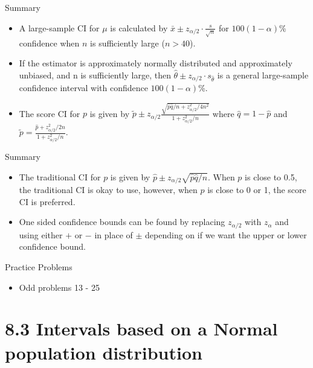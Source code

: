 \documentclass[
  ignorenonframetext,
]{beamer}
\providecommand{\tightlist}{%
  \setlength{\itemsep}{0pt}\setlength{\parskip}{0pt}}\usepackage{longtable,booktabs,array}
\begin{document}
\begin{frame}{Summary}
\protect\hypertarget{summary-2}{}
\begin{itemize}[<+->]
\tightlist
\item
  A large-sample CI for \(\mu\) is calculated by
  \(\bar{x} \pm z_{\alpha/2}\cdot \frac{s}{\sqrt{n}}\) for
  \(100(1-\alpha)\)\% confidence when \(n\) is sufficiently large
  (\(n>40\)).
\item
  If the estimator is approximately normally distributed and
  approximately unbiased, and n is sufficiently large, then
  \(\hat{\theta} \pm z_{\alpha/2}\cdot s_{\hat{\theta}}\) is a general
  large-sample confidence interval with confidence \(100(1-\alpha)\)\%.
\item
  The score CI for \(p\) is given by
  \(\tilde{p} \pm z_{\alpha/2}\frac{\sqrt{\hat{p}\hat{q}/n + z_{\alpha/2}^{2}/4n^{2}}}{1+z^{2}_{\alpha/2}/n}\)
  where \(\hat{q} = 1 - \hat{p}\) and
  \(\tilde{p} = \frac{\hat{p} + z_{\alpha/2}^{2}/2n}{1 + z^{2}_{\alpha/2}/n}\).
\end{itemize}
\end{frame}

\begin{frame}{Summary}
\protect\hypertarget{summary-3}{}
\begin{itemize}[<+->]
\tightlist
\item
  The traditional CI for \(p\) is given by
  \(\hat{p} \pm z_{\alpha/2}\sqrt{\hat{p}\hat{q}/n}\). When \(p\) is
  close to 0.5, the traditional CI is okay to use, however, when \(p\)
  is close to 0 or 1, the score CI is preferred.
\item
  One sided confidence bounds can be found by replacing \(z_{\alpha/2}\)
  with \(z_{\alpha}\) and using either \(+\) or \(-\) in place of
  \(\pm\) depending on if we want the upper or lower confidence bound.
\end{itemize}
\end{frame}

\begin{frame}{Practice Problems}
\protect\hypertarget{practice-problems-1}{}
\begin{itemize}[<+->]
\tightlist
\item
  Odd problems 13 - 25
\end{itemize}
\end{frame}

\hypertarget{intervals-based-on-a-normal-population-distribution}{%
\section{8.3 Intervals based on a Normal population
distribution}\label{intervals-based-on-a-normal-population-distribution}}
\end{document}
